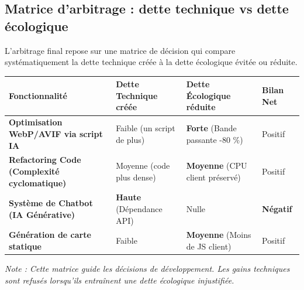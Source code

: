 \documentclass[
  10pt,
  a4paper,
  DIV=11,
  numbers=noendperiod,
  oneside]{scrreprt}
\newcounter{none} %
\let\oldtextbf\textbf
\renewcommand{\textbf}[1]{\oldtextbf{\textcolor{cmmnavy}{#1}}}
\let\oldemph\emph
\renewcommand{\emph}[1]{\oldemph{\textcolor{cmmgray}{#1}}}
\begin{document}
\subsection{Matrice d'arbitrage : dette technique vs dette
écologique}\label{matrice-darbitrage-dette-technique-vs-dette-uxe9cologique}

L'arbitrage final repose sur une matrice de décision qui compare
systématiquement la dette technique créée à la dette écologique évitée
ou réduite.

{\def\LTcaptype{none} %
\begin{longtable}[]{@{}
  >{\raggedright\arraybackslash}p{}
  >{\raggedright\arraybackslash}p{}
  >{\raggedright\arraybackslash}p{}
  >{\raggedright\arraybackslash}p{}@{}}
\toprule\noalign{}
\begin{minipage}[b]{\linewidth}\raggedright
Fonctionnalité
\end{minipage} & \begin{minipage}[b]{\linewidth}\raggedright
Dette Technique créée
\end{minipage} & \begin{minipage}[b]{\linewidth}\raggedright
Dette Écologique réduite
\end{minipage} & \begin{minipage}[b]{\linewidth}\raggedright
Bilan Net
\end{minipage} \\
\midrule\noalign{}
\endhead
\bottomrule\noalign{}
\endlastfoot
\textbf{Optimisation WebP/AVIF via script IA} & Faible (un script de
plus) & \textbf{Forte} (Bande passante -80 \%) & Positif \\
\textbf{Refactoring Code (Complexité cyclomatique)} & Moyenne (code plus
dense) & \textbf{Moyenne} (CPU client préservé) & Positif \\
\textbf{Système de Chatbot (IA Générative)} & \textbf{Haute} (Dépendance
API) & Nulle & \textbf{Négatif} \\
\textbf{Génération de carte statique} & Faible & \textbf{Moyenne} (Moins
de JS client) & Positif \\
\end{longtable}
}

\emph{Note : Cette matrice guide les décisions de développement. Les
gains techniques sont refusés lorsqu'ils entraînent une dette écologique
injustifiée.}
\end{document}
